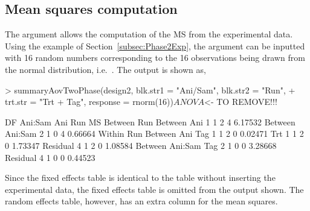 \documentclass[article]{jss}
\begin{document}
\subsection{Mean squares computation}
The argument  allows the computation of the MS from the experimental data. Using the example of Section~\ref{subsec:Phase2Exp}, the  argument can be inputted with 16 random numbers corresponding to the 16 observations being drawn from the normal distribution, i.e.\ . The output is shown as,
\begin{CodeChunk}
\begin{CodeInput} 
> summaryAovTwoPhase(design2, blk.str1 = "Ani/Sam", blk.str2 = "Run", 
+  trt.str = "Trt + Tag", response = rnorm(16))$ANOVA
$<- TO REMOVE!!!
\end{CodeInput}
\begin{CodeOutput} 
                   DF Ani:Sam Ani Run MS     
Between Run                                  
   Between Ani     1  1       2   4   6.17532
   Between Ani:Sam 2  1       0   4   0.66664
Within Run                                   
   Between Ani                               
      Tag          1  1       2   0   0.02471
      Trt          1  1       2   0   1.73347
      Residual     4  1       2   0   1.08584
   Between Ani:Sam                           
      Tag          2  1       0   0   3.28668
      Residual     4  1       0   0   0.44523
\end{CodeOutput}
\end{CodeChunk}  
Since the fixed effects table is identical to the table without inserting the experimental data, the fixed effects table is omitted from the output shown. The random effects table, however, has an extra column for the mean squares.
\end{document}
